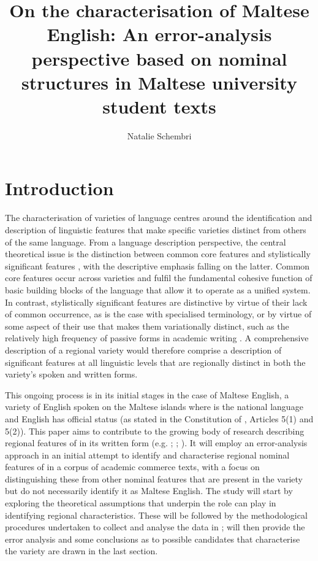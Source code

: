 \documentclass[output=paper]{langsci/langscibook}
\author{Natalie Schembri\affiliation{University of Malta}}
\title{On the characterisation of Maltese English: 
An error-analysis perspective based on nominal structures in Maltese university student texts
}
\begin{document}
\section{Introduction}

The characterisation of varieties of language centres around the
identification and description of linguistic features that make
specific varieties distinct from others of the same language. From a
language description perspective, the central theoretical issue is the
distinction between common core features and stylistically significant
features \citep{CrystalDavy1969}, with the descriptive emphasis
falling on the latter. Common core features occur across varieties and
fulfil the fundamental cohesive function of basic building blocks of
the language that allow it to operate as a unified system. In
contrast, stylistically significant features are distinctive by virtue
of their lack of common occurrence, as is the case with specialised
terminology, or by virtue of some aspect of their use that makes them
variationally distinct, such as the relatively high frequency of
passive forms in academic writing \citep{Swales1990}.  A comprehensive
description of a regional variety would therefore comprise a
description of significant features at all linguistic levels that are
regionally distinct in both the variety’s spoken and written forms.

This ongoing process is in its initial stages in the case of Maltese
English, a variety of English spoken on the Maltese islands where
 is the national language and English has official status (as stated in the Constitution of , \nocite{Con1964} Articles 5(1) and 5(2)). This paper
aims to contribute to the growing body of research describing regional
features of  in its written form
(e.g. \citealt{Schembri2005}; \citealt{HilbertKrug2012}; 
\citealt{KrugRosen2012}). It will employ an error-analysis approach in an
initial attempt to identify and characterise regional nominal features
of  in a corpus of academic commerce texts, with a
focus on distinguishing these from other nominal features that are
present in the variety but do not necessarily identify it as Maltese
English. The study will start by exploring the theoretical assumptions
that underpin the role  can play in identifying
regional characteristics. These will be followed by the methodological
procedures undertaken to collect and analyse the   data in
;  will then provide the error
analysis and some conclusions as to possible candidates that
characterise the variety are drawn in the last section.
\end{document}
